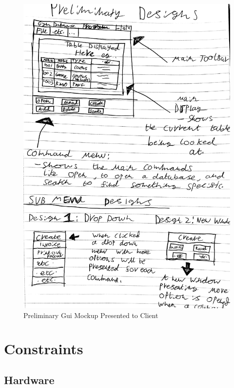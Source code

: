 \begin{figure}[H]
    \includegraphics[width=\textwidth]{PrelimDesigns(1).jpg}
    \caption{Preliminary Gui Mockup Presented to Client} \label{fig: Preliminary Gui Mockup Presented to Client}
\end{figure}

\section{Constraints}

\subsection{Hardware}

